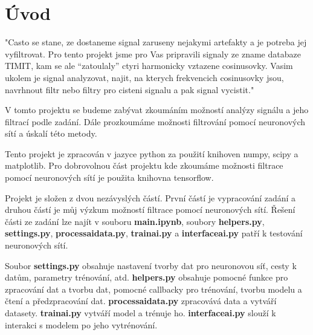 \section{Úvod}

"Casto se stane, ze dostaneme signal zaruseny nejakymi artefakty a je potreba jej vyfiltrovat. Pro tento projekt 
jsme pro Vas pripravili signaly ze zname databaze TIMIT, kam se ale “zatoulaly” ctyri harmonicky vztazene
cosinusovky. Vasim ukolem je signal analyzovat, najit, na kterych frekvencich cosinusovky jsou, navrhnout filtr
nebo filtry pro cisteni signalu a pak signal vycistit."

V tomto projektu se budeme zabývat zkoumáním možností analýzy signálu a jeho filtrací podle zadání.
Dále prozkoumáme možnosti filtrování pomocí neuronových sítí a úskalí této metody.

Tento projekt je zpracován v jazyce python za použití knihoven numpy, scipy a matplotlib. Pro dobrovolnou část projektu kde zkoumáme možnosti filtrace pomocí neuronových sítí je použita knihovna tensorflow.

Projekt je složen z dvou nezávyslých částí. První částí je vypracování zadání a druhou částí je můj výzkum možností filtrace pomocí neuronových sítí.
Řešení části ze zadání lze najít v souboru \textbf{main.ipynb}, soubory \textbf{helpers.py}, \textbf{settings.py}, \textbf{process\textunderscore ai\textunderscore data.py}, \textbf{train\textunderscore ai.py} a \textbf{interface\textunderscore ai.py} patří k testování neuronových sítí.

Soubor \textbf{settings.py} obsahuje nastavení tvorby dat pro neuronovou síť, cesty k datům, parametry trénování, atd.
\textbf{helpers.py} obsahuje pomocné funkce pro zpracování dat a tvorbu dat, pomocné callbacky pro trénování, tvorbu modelu a čtení a předzpracování dat.
\textbf{process\textunderscore ai\textunderscore data.py} zpracovává data a vytváří datasety.
\textbf{train\textunderscore ai.py} vytváří model a trénuje ho.
\textbf{interface\textunderscore ai.py} slouží k interakci s modelem po jeho vytrénování.